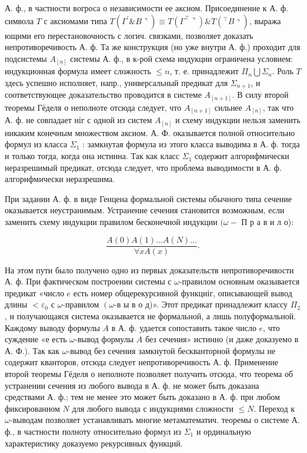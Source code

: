 \documentclass[10pt]{article}
\begin{document}
А. ф., в частности вогроса о независимости ее аксиом. Присоединение к А. ф. символа $T$ с аксиомами типа $\left.\left.T\left(\Gamma^{\prime} \& B\right\urcorner\right) \equiv T\left(\Gamma^{\top} \boldsymbol{\urcorner}\right) \& T\left({ }^{\top} B\right\urcorner\right)$, выража ющими его перестановочность с логич. связками, позволяет доказать непротиворечивость А. ф. Та же конструкция (но уже внутри А. ф.) проходит для подсистемы $A_{[n]}$ системы А. ф., в к-рой схема индукции ограничена условием: индукционная формула имеет сложность $\leqslant n$, т. е. принадлежит $\Pi_{n} \bigcup \Sigma_{n}$. Роль $T$ здесь успешно исполняет, напр., универсальный предикат для $\Sigma_{n+1}$, и соответствующее доказательство проводится в системе $A_{[n+1]}$. В силу второй теоремы Гёделя о неполноте отсюда следует, что $A_{[n+1]}$ сильнее $A_{[n]}$, так что А. ф. не совпадает ніг с одной из систем $A_{[n]}$ и схему индукции нельзя заменить никаким конечным множеством аксиом. А. Ф. оказывается полной относительно формул из класса $\Sigma_{1}$ : замкнутая формула из этого класса выводима в А. ф. тогда и только тогда, когда она истинна. Так как класс $\Sigma_{1}$ содержит алгорифмически неразрешимый предикат, отсюда следует, что проблема выводимости в А. ф. алгорифмически неразрешима.



При задании А. ф. в виде Генцена формальной системы обычного типа сечение оказывается неустранимым. Устранение сечения становится возможным, если заменить схему индукции правилом бесконечной индукции $(\omega-$ П р а в и л о):



\[

\frac{A(0) A(1) \ldots A(N) \ldots}{\forall x A(x)} .

\]



На этом пути было получено одно из первых доказательств непротиворечивости А. ф. При фактическом построении системы с $\omega$-правилом основным оказывается предикат «число $e$ есть номер общерекурсивной функциіг, описывающей вывод длины $<\varepsilon_{0}$ с $\omega$-правилом $\left(\omega\right.$-в ы в о д)». Этот предикат принадлежит классу $\Pi_{2}$, и получающаяся система оказывается не формальной, а лишь полуформальной. Каждому выводу формулы $A$ в А. ф. удается сопоставить такое число $e$, что суждение «е есть $\omega$-вывод формулы $A$ без сечения» истинно (и даже доказуемо в А. Ф.). Так как $\omega$-вывод без сечения замкнутой бескванторной формулы не содержит кванторов, отсюда следует непротиворечивость А. ф. Применение второй теоремы Гёделя о неполноте позволяет получить отсюда, что теорема об устранении сечения из любого вывода в А. ф. не может быть доказана средствами А. ф.; тем не менее это может быть доказано в А. ф. при любом фиксированном $N$ для любого вывода с индукциями сложности $\leqslant N$. Переход к $\omega$-выводам позволяет устанавливать многие метаматематич. теоремы о системе А. ф., в частности полноту относительно формул из $\Sigma_{1}$ и ординальную характеристику доказуемо рекурсивных функций.
\end{document}

